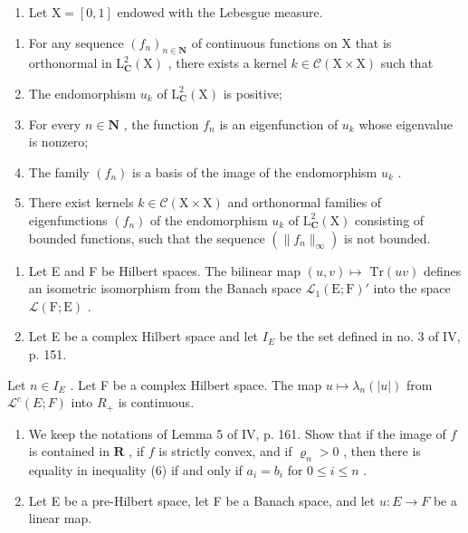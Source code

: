 \begin{enumerate}
\def\labelenumi{\arabic{enumi})}
\setcounter{enumi}{15}
\tightlist
\item
  Let \(\mathrm{X} = [0,1]\) endowed with the Lebesgue measure.
\end{enumerate}

\begin{enumerate}
\def\labelenumi{\alph{enumi})}
\item
  For any sequence \((f_n)_{n\in \mathbf{N}}\) of continuous functions on X that is orthonormal in \(\mathrm{L}_{\mathbf{C}}^2 (\mathrm{X})\) , there exists a kernel \(k\in \mathcal{C}(\mathrm{X}\times \mathrm{X})\) such that
\item
  The endomorphism \(u_{k}\) of \(\mathrm{L}_{\mathbf{C}}^{2}(\mathrm{X})\) is positive;
\item
  For every \(n \in \mathbf{N}\) , the function \(f_n\) is an eigenfunction of \(u_k\) whose eigenvalue is nonzero;
\item
  The family \((f_n)\) is a basis of the image of the endomorphism \(u_k\) .
\item
  There exist kernels \(k \in \mathcal{C}(\mathrm{X} \times \mathrm{X})\) and orthonormal families of eigenfunctions \((f_n)\) of the endomorphism \(u_k\) of \(\mathrm{L}_{\mathbf{C}}^2(\mathrm{X})\) consisting of bounded functions, such that the sequence \((\|f_n\|_\infty)\) is not bounded.
\end{enumerate}

\begin{enumerate}
\def\labelenumi{\arabic{enumi})}
\setcounter{enumi}{16}
\item
  Let E and F be Hilbert spaces. The bilinear map \((u,v)\mapsto\) \(\mathrm{Tr}(uv)\) defines an isometric isomorphism from the Banach space \(\mathcal{L}_1(\mathrm{E};\mathrm{F})'\) into the space \(\mathcal{L}(\mathrm{F};\mathrm{E})\) .
\item
  Let E be a complex Hilbert space and let \(I_{E}\) be the set defined in no. 3 of IV, p. 151.
\end{enumerate}

Let \(n \in I_{E}\) . Let F be a complex Hilbert space. The map \(u \mapsto \lambda_{n}(|u|)\) from \(\mathcal{L}^{c}(E;F)\) into \(R_{+}\) is continuous.

\begin{enumerate}
\def\labelenumi{\arabic{enumi})}
\setcounter{enumi}{18}
\item
  We keep the notations of Lemma 5 of IV, p. 161. Show that if the image of \(f\) is contained in \(\mathbf{R}\) , if \(f\) is strictly convex, and if \(\varrho_n > 0\) , then there is equality in inequality (6) if and only if \(a_i = b_i\) for \(0 \leqslant i \leqslant n\) .
\item
  Let E be a pre-Hilbert space, let F be a Banach space, and let \(u: E \to F\) be a linear map.
\end{enumerate}

